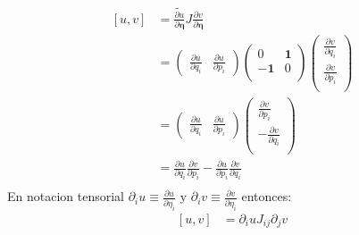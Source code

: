 \documentclass[a4paper]{article}
\begin{document}
\begin{answer}[punto 21]
        \begin{align*}
            \left[u,v\right] &= \tilde{\frac{\partial u}{\partial \pmb \eta}} J {\frac{\partial v}{\partial \pmb \eta}}\\
            &= \begin{pmatrix}
                \frac{\partial u}{\partial q_i} &
                \frac{\partial u}{\partial p_i} 
            \end{pmatrix} 
            \begin{pmatrix}
                0 & \mathbf 1\\
                -\mathbf 1 & 0\\
            \end{pmatrix}
            \begin{pmatrix}
                \frac{\partial v}{\partial q_i} \\
                \frac{\partial v}{\partial p_i} \\
            \end{pmatrix}\\
            &= \begin{pmatrix}
                \frac{\partial u}{\partial q_i} &
                \frac{\partial u}{\partial p_i}
            \end{pmatrix}
            \begin{pmatrix}
                \frac{\partial v}{\partial p_i} \\
                -\frac{\partial v}{\partial q_i} \\
            \end{pmatrix}\\
            &= \frac{\partial u}{\partial q_i} \frac{\partial v}{\partial p_i} - \frac{\partial u}{\partial p_i} \frac{\partial v}{\partial q_i}\\
        \end{align*}
        En notacion tensorial $\partial_i u \equiv \frac{\partial u}{\partial \eta_i}$ y $\partial_i v \equiv \frac{\partial v}{\partial \eta_i}$ entonces:
        \begin{align*}
            \left[u,v\right] &= \partial_i u J_{ij} \partial_j v\\
        \end{align*}


\end{answer}
\end{document}
